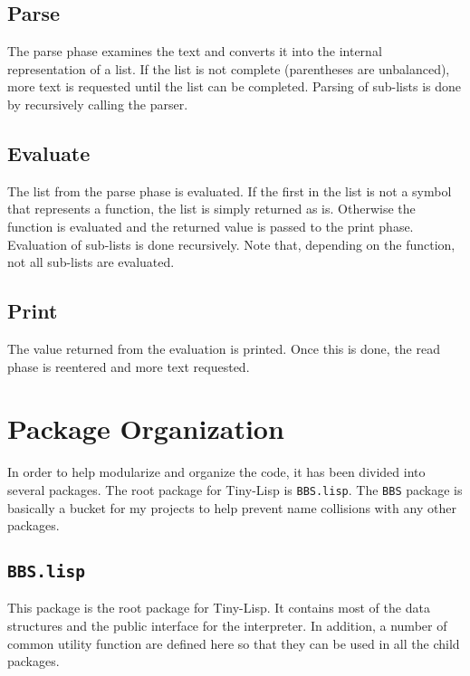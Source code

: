 \documentclass[10pt, openany]{book}
\newcommand{\package}[1]{\texttt{#1}}
\newcommand{\tl}{Tiny-Lisp}
\begin{document}
\subsection{Parse}
The parse phase examines the text and converts it into the internal representation of a list.  If the list is not complete (parentheses are unbalanced), more text is requested until the list can be completed.  Parsing of sub-lists is done by recursively calling the parser.

\subsection{Evaluate}
The list from the parse phase is evaluated.  If the first in the list is not a symbol that represents a function, the list is simply returned as is.  Otherwise the function is evaluated and the returned value is passed to the print phase.  Evaluation of sub-lists is done recursively.  Note that, depending on the function, not all sub-lists are evaluated.

\subsection{Print}
The value returned from the evaluation is printed.  Once this is done, the read phase is reentered and more text requested.

\section{Package Organization}
In order to help modularize and organize the code, it has been divided into several packages.  The root package for \tl{} is \package{BBS.lisp}.  The \package{BBS} package is basically a bucket for my projects to help prevent name collisions with any other packages.

\subsection{\package{BBS.lisp}}
This package is the root package for \tl{}.  It contains most of the data structures and the public interface for the interpreter.  In addition, a number of common utility function are defined here so that they can be used in all the child packages.
\end{document}
